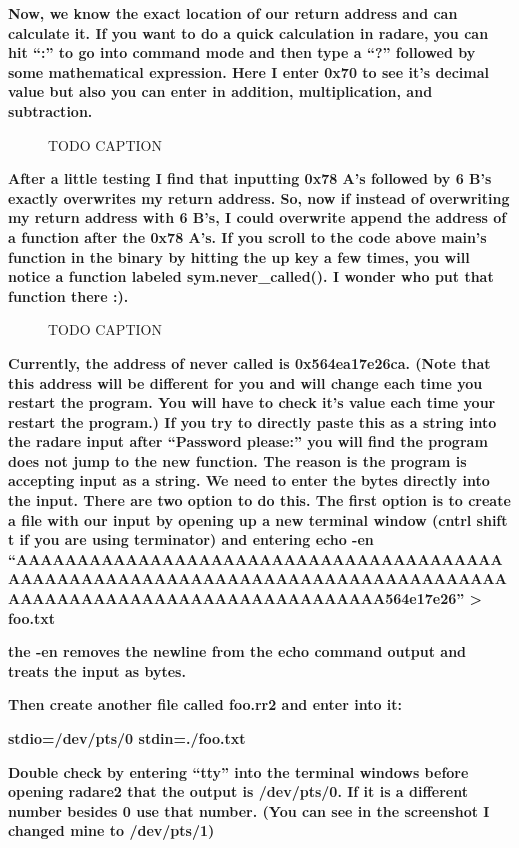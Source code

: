 \documentclass[letterpaper]{article}
\newcommand{\sitfig}[3]{
\begin{figure}[H]
\centering
\makebox[\textwidth][c]{
#2
}
\caption{#3}
\label{#1}
\end{figure}
}
\newcommand{\sitgfx}[4][scale=1.0]{
\sitfig{#3}{\texttt{[image: \#2]}}{#4}
}
\begin{document}
\textbf{Now, we know the exact location of our return address and can calculate it. If you want to do a quick
calculation in radare, you can hit ``:'' to go into command mode and then type a ``?'' followed by some mathematical
expression. Here I enter 0x70 to see it's decimal value but also you can enter in addition, multiplication, and
subtraction.}

  
\sitgfx[width=5.8335in,height=3.6457in]{FINALWORKINGDOCFORMERLYPRECURSOR-img089.png}{fig:unk}{TODO CAPTION}
 

\textbf{After a little testing I find that inputting 0x78 A's followed by 6 B's exactly overwrites my return address.
So, now if instead of overwriting my return address with 6 B's, I could overwrite append the address of a function
after the 0x78 A's. If you scroll to the code above main's function in the binary by hitting the up key a few times,
you will notice a function labeled sym.never\_called(). I wonder who put that function there :).}

  
\sitgfx[width=5.8335in,height=3.6457in]{FINALWORKINGDOCFORMERLYPRECURSOR-img096.png}{fig:unk}{TODO CAPTION}
 

\textbf{Currently, the address of never called is 0x564ea17e26ca. (Note that this address will be different for you and
will change each time you restart the program. You will have to check it's value each time your restart the program.)
If you try to directly paste this as a string into the radare input after ``Password please:'' you will find the
program does not jump to the new function. The reason is the program is accepting input as a string. We need to enter
the bytes directly into the input. There are two option to do this. The first option is to create a file with our input
by opening up a new terminal window (cntrl shift t if you are using terminator) and entering echo -en
``AAAAAAAAAAAAAAAAAAAAAAAAAAAAAAAAAAAAAAAAAAAAAAAAAAAAAAAAAAAAAAAAAAAAAAAAAAAAAAAAAAAAAAAAAAAAAAAAAAAAAAAAAAAAAAAA564e17e26''
{\textgreater} foo.txt}

\textbf{the -en removes the newline from the echo command output and treats the input as bytes.}

\textbf{Then create another file called foo.rr2 and enter into it:}

\textbf{stdio=/dev/pts/0\newline
stdin=./foo.txt}

\textbf{Double check by entering ``tty'' into the terminal windows before opening radare2 that the output is /dev/pts/0.
If it is a different number besides 0 use that number. (You can see in the screenshot I changed mine to /dev/pts/1)}
\end{document}
